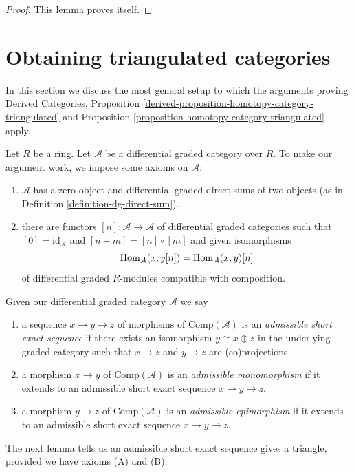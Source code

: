 \begin{proof}
This lemma proves itself.
\end{proof}









\section{Obtaining triangulated categories}
\label{section-review}

\noindent
In this section we discuss the most general setup to which the arguments
proving Derived Categories, Proposition
\ref{derived-proposition-homotopy-category-triangulated} and
Proposition \ref{proposition-homotopy-category-triangulated} apply.

\medskip\noindent
Let $R$ be a ring. Let $\mathcal{A}$ be a differential graded category
over $R$. To make our argument work, we impose some axioms on $\mathcal{A}$:
\begin{enumerate}
\item[(A)] $\mathcal{A}$ has a zero object and differential
graded direct sums of two objects
(as in Definition \ref{definition-dg-direct-sum}).
\item[(B)] there are functors $[n] : \mathcal{A} \longrightarrow \mathcal{A}$
of differential graded categories such that
$[0] = \text{id}_\mathcal{A}$ and $[n + m] = [n] \circ [m]$
and given isomorphisms
$$
\mathop{\mathrm{Hom}}\nolimits_\mathcal{A}(x, y[n]) = \mathop{\mathrm{Hom}}\nolimits_\mathcal{A}(x, y)[n]
$$
of differential graded $R$-modules compatible with composition.
\end{enumerate}

\noindent
Given our differential graded category $\mathcal{A}$ we say
\begin{enumerate}
\item a sequence $x \to y \to z$ of morphisms of $\text{Comp}(\mathcal{A})$
is an {\it admissible short exact sequence} if there exists
an isomorphism $y \cong x \oplus z$ in the underlying graded category
such that $x \to z$ and $y \to z$ are (co)projections.
\item a morphism $x\to y$ of $\text{Comp}(\mathcal{A})$ is an
{\it admissible monomorphism} if it extends to an
admissible short exact sequence $x\to y\to z$.
\item a morphism $y\to z$ of $\text{Comp}(\mathcal{A})$ is an
{\it admissible epimorphism} if it extends to an
admissible short exact sequence $x\to y\to z$.
\end{enumerate}
The next lemma tells us an admissible short exact sequence gives a
triangle, provided we have axioms (A) and (B).

